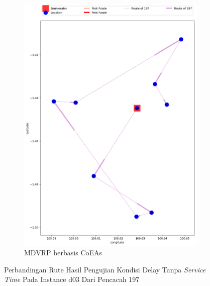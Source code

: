 \begin{figure}[H]
	\centering
	\begin{subfigure}[t]{\textwidth}
		\centering
		\includegraphics[width=\textwidth]{Resources/Images/delayed_3/real_m15_n100_delayed_3_197_coes}
		\caption{MDVRP berbasis CoEAs}
		\label{fig:real_m15_n100_delayed_3_197_coes}
	\end{subfigure}
	\caption{Perbandingan Rute Hasil Pengujian Kondisi Delay Tanpa \textit{Service Time} Pada Instance d03 Dari Pencacah 197}
	\label{fig:real_m15_n100_delayed_3_197}
\end{figure}


